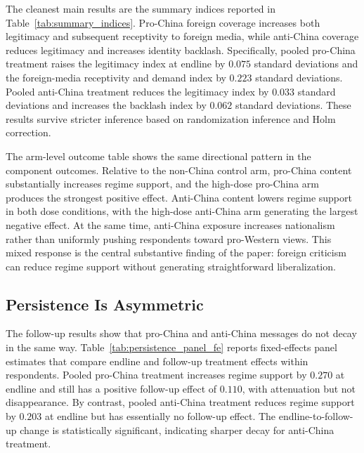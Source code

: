 \documentclass[12pt,american]{article}
\begin{document}
	The cleanest main results are the summary indices reported in Table~\ref{tab:summary_indices}. Pro-China foreign coverage increases both legitimacy and subsequent receptivity to foreign media, while anti-China coverage reduces legitimacy and increases identity backlash. Specifically, pooled pro-China treatment raises the legitimacy index at endline by \(0.075\) standard deviations and the foreign-media receptivity and demand index by \(0.223\) standard deviations. Pooled anti-China treatment reduces the legitimacy index by \(0.033\) standard deviations and increases the backlash index by \(0.062\) standard deviations. These results survive stricter inference based on randomization inference and Holm correction.
	
	
	
	The arm-level outcome table shows the same directional pattern in the component outcomes. Relative to the non-China control arm, pro-China content substantially increases regime support, and the high-dose pro-China arm produces the strongest positive effect. Anti-China content lowers regime support in both dose conditions, with the high-dose anti-China arm generating the largest negative effect. At the same time, anti-China exposure increases nationalism rather than uniformly pushing respondents toward pro-Western views. This mixed response is the central substantive finding of the paper: foreign criticism can reduce regime support without generating straightforward liberalization.
	
	
	
	\subsection*{Persistence Is Asymmetric}
	
	The follow-up results show that pro-China and anti-China messages do not decay in the same way. Table~\ref{tab:persistence_panel_fe} reports fixed-effects panel estimates that compare endline and follow-up treatment effects within respondents. Pooled pro-China treatment increases regime support by \(0.270\) at endline and still has a positive follow-up effect of \(0.110\), with attenuation but not disappearance. By contrast, pooled anti-China treatment reduces regime support by \(0.203\) at endline but has essentially no follow-up effect. The endline-to-follow-up change is statistically significant, indicating sharper decay for anti-China treatment.
	
\end{document}
